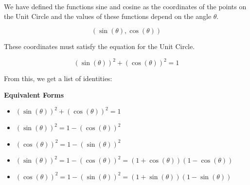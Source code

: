 \documentclass{ximera}
\begin{document}
We have defined the functions sine and cosine as the coordinates of the points on the Unit Circle and the values of these functions depend on the angle $\theta$.

\[    ( \sin(\theta), \cos(\theta) ) \]


These coordinates must satisfy the equation for the Unit Circle. 



\[    ( \sin(\theta) )^2 + ( \cos(\theta) )^2 = 1 \]



From this, we get a list of identities:



\begin{observation} \textbf{\textcolor{-red!75}{Equivalent Forms}}


\begin{itemize}
\item $( \sin(\theta) )^2 + ( \cos(\theta) )^2 = 1$
\item $( \sin(\theta) )^2 =  1 - ( \cos(\theta) )^2$
\item $( \cos(\theta) )^2 =  1 - ( \sin(\theta) )^2$
\item $( \sin(\theta) )^2 =  1 - ( \cos(\theta) )^2 = (1 + \cos(\theta))(1 - \cos(\theta))$
\item $( \cos(\theta) )^2 =  1 - ( \sin(\theta) )^2 = (1 + \sin(\theta))(1 - \sin(\theta))$
\end{itemize}


\end{observation}
\end{document}
